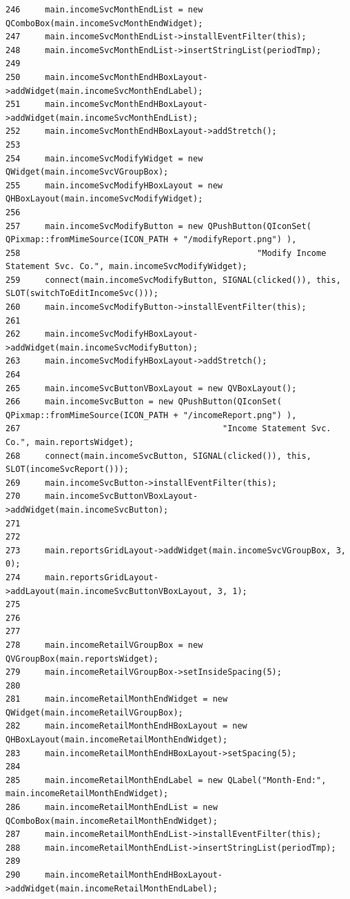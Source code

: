 \begin{verbatim}
246     main.incomeSvcMonthEndList = new QComboBox(main.incomeSvcMonthEndWidget);
247     main.incomeSvcMonthEndList->installEventFilter(this);
248     main.incomeSvcMonthEndList->insertStringList(periodTmp);
249     
250     main.incomeSvcMonthEndHBoxLayout->addWidget(main.incomeSvcMonthEndLabel);
251     main.incomeSvcMonthEndHBoxLayout->addWidget(main.incomeSvcMonthEndList);
252     main.incomeSvcMonthEndHBoxLayout->addStretch();
253     
254     main.incomeSvcModifyWidget = new QWidget(main.incomeSvcVGroupBox);
255     main.incomeSvcModifyHBoxLayout = new QHBoxLayout(main.incomeSvcModifyWidget);
256     
257     main.incomeSvcModifyButton = new QPushButton(QIconSet( QPixmap::fromMimeSource(ICON_PATH + "/modifyReport.png") ),
258                                                "Modify Income Statement Svc. Co.", main.incomeSvcModifyWidget);
259     connect(main.incomeSvcModifyButton, SIGNAL(clicked()), this, SLOT(switchToEditIncomeSvc()));
260     main.incomeSvcModifyButton->installEventFilter(this);
261     
262     main.incomeSvcModifyHBoxLayout->addWidget(main.incomeSvcModifyButton);
263     main.incomeSvcModifyHBoxLayout->addStretch();
264     
265     main.incomeSvcButtonVBoxLayout = new QVBoxLayout();
266     main.incomeSvcButton = new QPushButton(QIconSet( QPixmap::fromMimeSource(ICON_PATH + "/incomeReport.png") ),
267                                         "Income Statement Svc. Co.", main.reportsWidget);
268     connect(main.incomeSvcButton, SIGNAL(clicked()), this, SLOT(incomeSvcReport()));
269     main.incomeSvcButton->installEventFilter(this);
270     main.incomeSvcButtonVBoxLayout->addWidget(main.incomeSvcButton);
271     
272     
273     main.reportsGridLayout->addWidget(main.incomeSvcVGroupBox, 3, 0);
274     main.reportsGridLayout->addLayout(main.incomeSvcButtonVBoxLayout, 3, 1);
275     
276 
277     
278     main.incomeRetailVGroupBox = new QVGroupBox(main.reportsWidget);
279     main.incomeRetailVGroupBox->setInsideSpacing(5);
280     
281     main.incomeRetailMonthEndWidget = new QWidget(main.incomeRetailVGroupBox);
282     main.incomeRetailMonthEndHBoxLayout = new QHBoxLayout(main.incomeRetailMonthEndWidget);
283     main.incomeRetailMonthEndHBoxLayout->setSpacing(5);
284     
285     main.incomeRetailMonthEndLabel = new QLabel("Month-End:", main.incomeRetailMonthEndWidget);
286     main.incomeRetailMonthEndList = new QComboBox(main.incomeRetailMonthEndWidget);
287     main.incomeRetailMonthEndList->installEventFilter(this);
288     main.incomeRetailMonthEndList->insertStringList(periodTmp);
289     
290     main.incomeRetailMonthEndHBoxLayout->addWidget(main.incomeRetailMonthEndLabel);

\end{verbatim}
